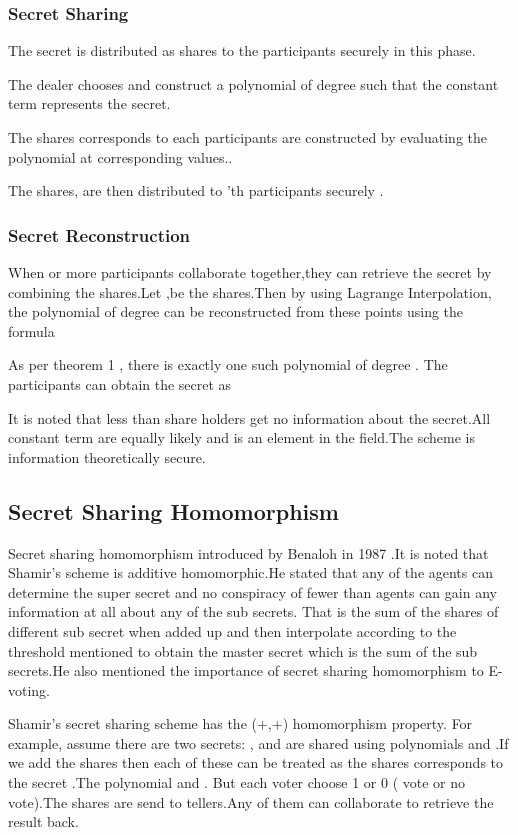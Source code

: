 \documentclass[conference]{IEEEtran}
\begin{document}
\subsubsection{Secret Sharing}
The secret  is distributed as shares to the participants securely in this phase.

The dealer chooses  and construct a polynomial  of degree  such that the constant term  represents the secret.


The shares corresponds to each participants are constructed by evaluating the polynomial at corresponding  values..

The shares,   are then distributed to 'th participants
securely .

\subsubsection{Secret Reconstruction}

When  or more participants collaborate together,they can retrieve the secret  by combining the shares.Let  ,be the  shares.Then by using Lagrange Interpolation, the polynomial of degree  can be reconstructed from these  points using the formula 



As per theorem 1 , there is exactly one such polynomial of degree . The participants can obtain the secret  as


It is noted that less than  share holders  get no information about the secret.All constant term are equally likely and is an element in the field.The scheme is information theoretically secure.

\subsection{Secret Sharing Homomorphism}

Secret sharing homomorphism introduced by Benaloh in 1987 \cite{benaloh1987secret}.It is noted that Shamir's scheme is additive homomorphic.He stated that any  of the  agents can determine the super secret and no conspiracy of fewer than  agents can gain any information at all about any of the sub secrets. That is the sum of the shares of different sub secret when added up and then interpolate according to the threshold mentioned to obtain the master secret which is the sum of the sub secrets.He also mentioned the importance of secret sharing homomorphism to E-voting.

Shamir's secret sharing scheme has the (+,+) homomorphism property. For example, assume there are two secrets: ,  and are shared using polynomials  and .If we add the shares  then each of these  can be treated as the shares corresponds to the secret .The polynomial  and .
But each voter choose 1 or 0 ( vote or no vote).The shares are send to  tellers.Any  of them can collaborate to retrieve the result back.
\end{document}
